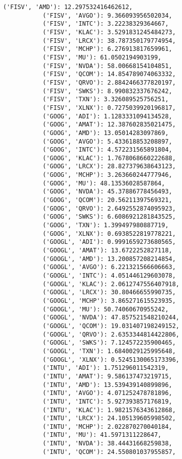 \documentclass[11pt]{article}
\begin{document}
\begin{Verbatim}[commandchars=\\\{\}]
           ('FISV', 'AMD'): 12.297532416462612,
           ('FISV', 'AVGO'): 9.366093956502034,
           ('FISV', 'INTC'): 3.22238329364667,
           ('FISV', 'KLAC'): 3.5291831245484273,
           ('FISV', 'LRCX'): 38.787350179774954,
           ('FISV', 'MCHP'): 6.276913817659961,
           ('FISV', 'MU'): 61.0502194903199,
           ('FISV', 'NVDA'): 58.00668154104851,
           ('FISV', 'QCOM'): 14.854789074063332,
           ('FISV', 'QRVO'): 2.8842466377820197,
           ('FISV', 'SWKS'): 8.990832337676242,
           ('FISV', 'TXN'): 3.326089525756251,
           ('FISV', 'XLNX'): 0.7275039920196817,
           ('GOOG', 'ADI'): 1.1283331094134528,
           ('GOOG', 'AMAT'): 12.387602835021475,
           ('GOOG', 'AMD'): 13.05014283097869,
           ('GOOG', 'AVGO'): 5.433618853208897,
           ('GOOG', 'INTC'): 4.572231565891804,
           ('GOOG', 'KLAC'): 1.7678068660222688,
           ('GOOG', 'LRCX'): 28.827379638643123,
           ('GOOG', 'MCHP'): 3.263660244777946,
           ('GOOG', 'MU'): 48.13536028587864,
           ('GOOG', 'NVDA'): 45.37886778456493,
           ('GOOG', 'QCOM'): 20.56211397569321,
           ('GOOG', 'QRVO'): 2.6492552874095923,
           ('GOOG', 'SWKS'): 6.6086921281843525,
           ('GOOG', 'TXN'): 1.399497980887719,
           ('GOOG', 'XLNX'): 0.6938522819778221,
           ('GOOGL', 'ADI'): 0.9991659273680565,
           ('GOOGL', 'AMAT'): 13.6722252827118,
           ('GOOGL', 'AMD'): 13.200857208214854,
           ('GOOGL', 'AVGO'): 6.221321566606663,
           ('GOOGL', 'INTC'): 4.051446129603078,
           ('GOOGL', 'KLAC'): 2.0612747556407918,
           ('GOOGL', 'LRCX'): 30.80466655990735,
           ('GOOGL', 'MCHP'): 3.865271615523935,
           ('GOOGL', 'MU'): 50.74060670955242,
           ('GOOGL', 'NVDA'): 47.857521548210244,
           ('GOOGL', 'QCOM'): 19.031407198249152,
           ('GOOGL', 'QRVO'): 2.6353344814422806,
           ('GOOGL', 'SWKS'): 7.124572235900465,
           ('GOOGL', 'TXN'): 1.6840029125995648,
           ('GOOGL', 'XLNX'): 0.5245130065173396,
           ('INTU', 'ADI'): 1.751296011542319,
           ('INTU', 'AMAT'): 9.586137473219715,
           ('INTU', 'AMD'): 13.539439140899896,
           ('INTU', 'AVGO'): 4.071252478781896,
           ('INTU', 'INTC'): 5.927393857176819,
           ('INTU', 'KLAC'): 1.9821576343612868,
           ('INTU', 'LRCX'): 24.105139605998502,
           ('INTU', 'MCHP'): 2.022870270040184,
           ('INTU', 'MU'): 41.5971311228647,
           ('INTU', 'NVDA'): 38.44431668259838,
           ('INTU', 'QCOM'): 24.550801037955857,

\end{Verbatim}
\end{document}
